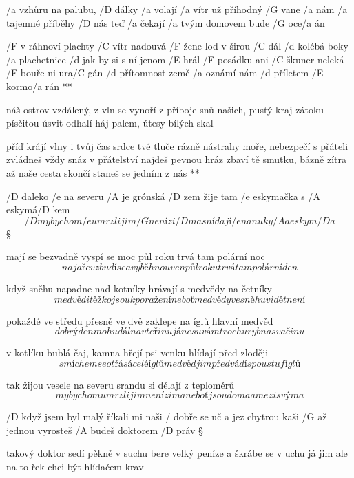 
/a vzhůru na palubu, /D dálky /a volají
/a vítr už příhodný /G vane /a nám
/a tajemné příběhy /D nás teď /a čekají
/a tvým domovem bude /G oce/a án

\R  /F v ráhnoví plachty /C vítr nadouvá
    /F žene loď v širou /C dál
    /d kolébá boky /a plachetnice
    /d jak by si s ní jenom /E hrál
    /F posádku ani /C škuner neleká
    /F bouře ni ura/C gán
    /d přítomnost země /a oznámí nám
    /d příletem /E kormo/a rán **

náš ostrov vzdálený, z vln se vynoří
z příboje snů našich, pustý kraj
zátoku písčitou úsvit odhalí
háj palem, útesy bílých skal

\R  příď krájí vlny i tvůj čas
    srdce tvé tluče rázně
    nástrahy moře, nebezpečí
    s přáteli zvládneš vždy snáz
    v přátelství najdeš pevnou hráz
    zbaví tě smutku, bázně
    zítra až naše cesta skončí
    staneš se jedním z nás **




/D daleko /e na severu /A je grónská /D zem
žije tam /e eskymačka s /A eskymá/D kem
\[ /D my bychom /e umrzli jim /G není zi/D ma
snídají /e nanuky /A a eskym/D a \]\S

mají se bezvadně vyspí se moc
půl roku trvá tam polární noc
\[ na jaře vzbudí se a vyběhnou ven
půl roku trvá tam polární den \]\s

když sněhu napadne nad kotníky
hrávají s medvědy na četníky
\[ medvědi těžko jsou k poražení
neboť medvědy ve sněhu vidět není \]\s

pokaždé ve středu přesně ve dvě
zaklepe na íglů hlavní medvěd
\[ dobrý den mohu dál na vteřinu
já nesu vám trochu ryb na svačinu \]\s

v kotlíku bublá čaj, kamna hřejí
psi venku hlídají před zloději
\[ smíchem se otřásá celé íglů
medvěd jim předvádí spoustu fíglů \]\s

tak žijou vesele na severu
srandu si dělají z teploměrů
\[ my bychom umrzli jim není zima
neboť jsou doma a mezi svýma \]




/D když jsem byl malý říkali mi naši
/ dobře se uč a jez chytrou kaši
/G až jednou vyrosteš /A budeš doktorem /D práv \S

takový doktor sedí pěkně v suchu
bere velký peníze a škrábe se v uchu
já jim ale na to řek chci být hlídačem krav \s

